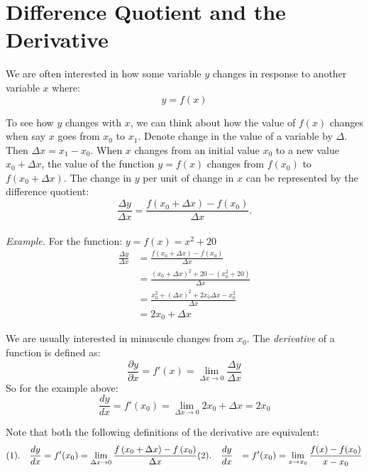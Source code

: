 \documentclass{./../../latex/handout}
\begin{document}
\thispagestyle{plain}
\newcommand{\mytitle}{Calculus}
\myheader{\mytitle}


\section{Difference Quotient and the Derivative}
We are often interested in how some variable $y$ changes in response to another variable $x$ where:
\[
y=f(x)
\]

To see how $y$ changes with $x$, we can think about how the value of $f(x)$ changes when say $x$ goes from $x_0$ to $x_1$. Denote change in the value of a variable by $\Delta$. Then $\Delta x=x_{1}-x_{0}$. When $x$ changes from an initial value $x_{0}$ to a new value $x_{0}+\Delta x$, the value of the function $y=f(x)$ changes from $f\left(x_{0}\right)$ to $f\left(x_{0}+\Delta x\right)$. The change in $y$ per unit of change in $x$ can be represented by the difference quotient:
\[
\frac{\Delta y}{\Delta x}=\frac{f\left(x_{0}+\Delta x\right)-f\left(x_{0}\right)}{\Delta x} .
\] \\

\textit{Example.} For the function: $y=f(x)=x^{2}+20$
\begin{align*} \frac{\Delta y}{\Delta x}&=\frac{f\left(x_{0}+\Delta x\right)-f\left(x_{0}\right)}{\Delta x} \\
&= \frac{(x_0+\Delta x)^2+20-(x_0^2+20)}{\Delta x} \\
&= \frac{x_0^2+ (\Delta x)^2+2 x_0 \Delta x-x_0^2}{\Delta x} \\&= 2 x_0 + \Delta x
\end{align*} 

We are usually interested in minuscule changes from $x_0$. The \textit{derivative} of a function is defined as:
\[ \frac{\partial y}{\partial x} = f'(x)= \lim_{\Delta x \rightarrow 0} \frac{\Delta y}{\Delta x} \]
So for the example above:
\[ \frac{d y}{d x} = f'(x_0)= \lim_{\Delta x \rightarrow 0} 2 x_0 + \Delta x = 2 x_0 \]

Note that both the following definitions of the derivative are equivalent:
\begin{align*}
(1). \quad 	\frac{d y}{d x} &= f'(x_0) = \lim_{\Delta x \rightarrow 0} \frac{f\left(x_{0}+\Delta x\right)-f\left(x_{0}\right)}{\Delta x} \vspace{1em}
(2). \quad 	\frac{d y}{d x} &= f'(x_0) = \lim_{ x \rightarrow x_0} \frac{f(x)-f(x_{0})}{x-x_0}  
\end{align*} \\
\end{document}
